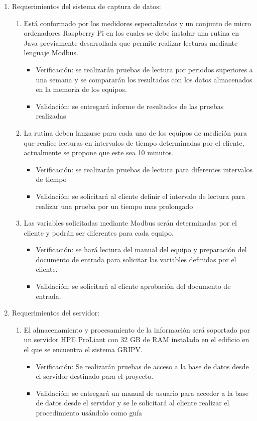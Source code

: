 \documentclass[
11pt, %
codirector, %
]{charter}
\begin{document}
\begin{enumerate}
	\item Requerimientos del sistema de captura de datos:
		\begin{enumerate}
			\item Está conformado por los medidores especializados y un conjunto de micro ordenadores Raspberry Pi en los cuales se debe instalar una rutina en Java previamente desarrollada que permite realizar lecturas mediante lenguaje Modbus.
			
\begin{itemize}
	\item Verificación: se realizarán pruebas de lectura por periodos superiores a una semana y se compararán los resultados con los datos almacenados en la memoria de los equipos.
	\item Validación: se entregará informe de resultados de las pruebas realizadas
\end{itemize}

			\item La rutina deben lanzarse para cada uno de los equipos de medición para que realice lecturas en intervalos de tiempo determinadas por el cliente, actualmente se propone que este sea 10 minutos.
			
\begin{itemize}
	\item Verificación: se realizarán pruebas de lectura para diferentes intervalos de tiempo
	\item Validación: se solicitará al cliente definir el intervalo de lectura para realizar una prueba por un tiempo mas prolongado 
\end{itemize}
			\item Las variables solicitadas mediante Modbus serán determinadas por el cliente y podrán ser diferentes para cada equipo.
			
\begin{itemize}
	\item Verificación: se hará lectura del manual del equipo y preparación del documento de entrada para solicitar las variables definidas por el cliente.
	\item Validación: se solicitará al cliente aprobación del documento de entrada.
\end{itemize}
		\end{enumerate}
	\item Requerimientos del servidor:
		\begin{enumerate}
			\item El almacenamiento y procesamiento de la información será soportado por un servidor HPE ProLiant con 32 GB de RAM instalado en el edificio en el que se encuentra el sistema GRIPV.
\begin{itemize}
\item Verificación: Se realizarán pruebas de acceso a la base de datos desde el servidor destinado para el proyecto.
\item Validación: se entregará un manual de usuario para acceder a la base de datos desde el servidor y se le solicitará al cliente realizar el procedimiento usándolo como guía 
\end{itemize}
			

\end{enumerate}
\end{enumerate}
\end{document}
